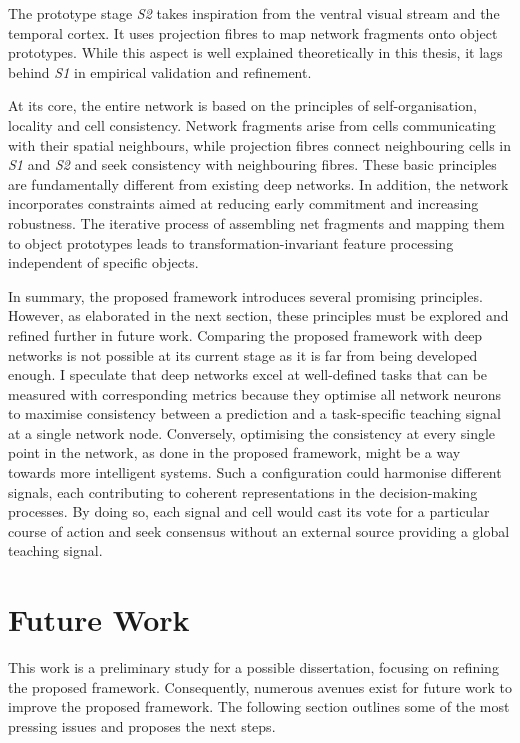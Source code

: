 The prototype stage \emph{S2} takes inspiration from the ventral visual stream and the temporal cortex.
It uses projection fibres to map network fragments onto object prototypes. While this aspect is well explained theoretically in this thesis, it lags behind \emph{S1} in empirical validation and refinement.


At its core, the entire network is based on the principles of self-organisation, locality and cell consistency.
Network fragments arise from cells communicating with their spatial neighbours, while projection fibres connect neighbouring cells in \emph{S1} and \emph{S2} and seek consistency with neighbouring fibres.
These basic principles are fundamentally different from existing deep networks. In addition, the network incorporates constraints aimed at reducing early commitment and increasing robustness. The iterative process of assembling net fragments and mapping them to object prototypes leads to transformation-invariant feature processing independent of specific objects.

In summary, the proposed framework introduces several promising principles. However, as elaborated in the next section, these principles must be explored and refined further in future work.
Comparing the proposed framework with deep networks is not possible at its current stage as it is far from being developed enough. 
I speculate that deep networks excel at well-defined tasks that can be measured with corresponding metrics because they optimise all network neurons to maximise consistency between a prediction and a task-specific teaching signal at a single network node. Conversely, optimising the consistency at every single point in the network, as done in the proposed framework, might be a way towards more intelligent systems. Such a configuration could harmonise different signals, each contributing to coherent representations in the decision-making processes. By doing so, each signal and cell would cast its vote for a particular course of action and seek consensus without an external source providing a global teaching signal.


\section{Future Work}
This work is a preliminary study for a possible dissertation, focusing on refining the proposed framework.
Consequently, numerous avenues exist for future work to improve the proposed framework. The following section outlines some of the most pressing issues and proposes the next steps.



